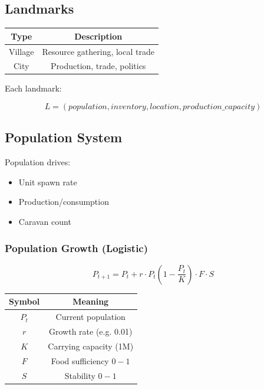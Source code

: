 \subsection{Landmarks}

\begin{table}[H]
\centering
\begin{tabular}{|c|c|}
\hline
Type & Description \\
\hline
Village & Resource gathering, local trade \\
City & Production, trade, politics \\
\hline
\end{tabular}
\end{table}

Each landmark:

\begin{equation}
L = (population, inventory, location, production\_capacity)
\end{equation}



\subsection{Population System}

Population drives:

\begin{itemize}
\item Unit spawn rate
\item Production/consumption
\item Caravan count
\end{itemize}



\subsubsection{Population Growth (Logistic)}

\begin{equation}
P_{t+1} = P_t + r \cdot P_t 
\left(1 - \frac{P_t}{K}\right) \cdot F \cdot S
\end{equation}

\begin{table}[H]
\centering
\begin{tabular}{|c|c|}
\hline
Symbol & Meaning \\
\hline
$P_t$ & Current population \\
$r$ & Growth rate (e.g. 0.01) \\
$K$ & Carrying capacity (1M) \\
$F$ & Food sufficiency $0-1$ \\
$S$ & Stability $0-1$ \\
\hline
\end{tabular}
\end{table}


